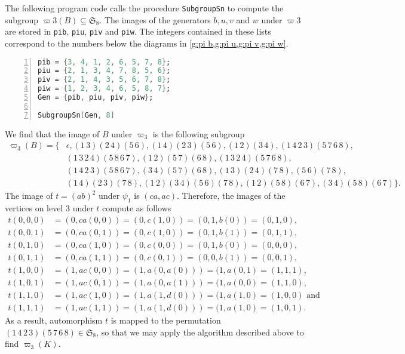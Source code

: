 The following program code calls the procedure \verb+SubgroupSn+ to compute the subgroup $\varpi3(B)\subseteq\mathfrak{S}_8$. The images of the generators $b,u,v$ and $w$ under $\varpi3$ are stored in \verb+pib+, \verb+piu+, \verb+piv+ and \verb+piw+. The integers contained in these lists correspond to the numbers below the diagrams in \cref{g:pi b,g:pi u,g:pi v,g:pi w}.
\begin{lstlisting}[language=Mathematica, numbers=left, numberstyle=\tiny, stepnumber=2, numbersep=5pt]
pib = {3, 4, 1, 2, 6, 5, 7, 8};
piu = {2, 1, 3, 4, 7, 8, 5, 6};
piv = {2, 1, 4, 3, 5, 6, 7, 8};
piw = {1, 2, 3, 4, 6, 5, 8, 7};
Gen = {pib, piu, piv, piw};

SubgroupSn[Gen, 8]
\end{lstlisting}
We find that the image of $B$ under $\varpi_3$ is the following subgroup
\begin{align*}
\varpi_3(B)=\lbrace	&\epsilon,(1\, 3)(2\, 4)(5\, 6),   (1\, 4)(2\, 3)(5\, 6), (1\, 2)(3\, 4),   (1\, 4\, 2\, 3)(5\, 7\, 6\, 8),\\
   					&(1\, 3\, 2\, 4)(5\, 8\, 6\, 7),   (1\, 2)(5\, 7)(6\, 8),   (1\, 3\, 2\, 4)(5\, 7\, 6\, 8),\\
   					&(1\, 4\, 2\, 3)(5\, 8\, 6\, 7),   (3\, 4)(5\, 7)(6\, 8), (1\, 3)(2\, 4)(7\, 8),   (5\, 6)(7\, 8),\\
   					&(1\, 4)(2\, 3)(7\, 8),   (1\, 2)(3\, 4)(5\, 6)(7\, 8),   (1\, 2)(5\, 8)(6\, 7), (3\, 4)(5\, 8)(6\, 7)\rbrace.
\end{align*}
The image of $t=(ab)^2$ under $\psi_1$ is $(ca,ac)$. Therefore, the images of the vertices on level 3 under $t$ compute as follows
\begin{align*}
t(0,0,0)&=(0,ca(0,0))=(0,c(1,0))=(0,1,b(0))=(0,1,0),\\
t(0,0,1)&=(0,ca(0,1))=(0,c(1,0))=(0,1,b(1))=(0,1,1),\\
t(0,1,0)&=(0,ca(1,0))=(0,c(0,0))=(0,1,b(0))=(0,0,0),\\
t(0,1,1)&=(0,ca(1,1))=(0,c(0,1))=(0,0,b(1))=(0,0,1),\\[2em]
t(1,0,0)&=(1,ac(0,0))=(1,a(0,a(0)))=(1,a(0,1)=(1,1,1),\\
t(1,0,1)&=(1,ac(0,1))=(1,a(0,a(1)))=(1,a(0,0)=(1,1,0),\\
t(1,1,0)&=(1,ac(1,0))=(1,a(1,d(0)))=(1,a(1,0)=(1,0,0)\text{ and}\\
t(1,1,1)&=(1,ac(1,1))=(1,a(1,d(0)))=(1,a(1,0)=(1,0,1).
\end{align*}
As a result, automorphism $t$ is mapped to the permutation $(1\,4\,2\,3)(5\,7\,6\,8)\in\mathfrak{S}_8$, so that we may apply the algorithm described above to find $\varpi_3(K)$.

